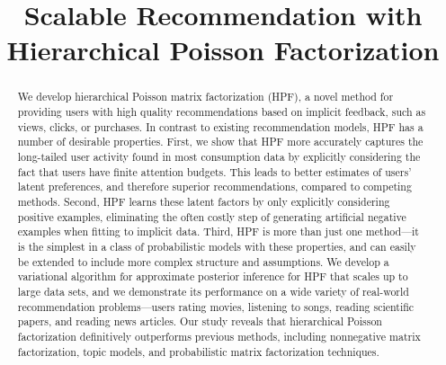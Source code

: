 \documentclass[]{article}
\title{Scalable Recommendation with Hierarchical Poisson Factorization}
\author{} %
\begin{document}
\maketitle

\begin{abstract}
We develop hierarchical Poisson matrix factorization (HPF), a novel
method for providing users with high quality recommendations based on
implicit feedback, such as views, clicks, or purchases.  In contrast
to existing recommendation models, HPF has a number of desirable
properties.  First, we show that HPF more accurately captures the
long-tailed user activity found in most consumption data by explicitly
considering the fact that users have finite attention budgets.  This
leads to better estimates of users' latent preferences, and therefore
superior recommendations, compared to competing methods.  Second, HPF
learns these latent factors by only explicitly considering positive
examples, eliminating the often costly step of generating artificial
negative examples when fitting to implicit data.  Third, HPF is more
than just one method---it is the simplest in a class of probabilistic
models with these properties, and can easily be extended to include
more complex structure and assumptions.  We develop a variational
algorithm for approximate posterior inference for HPF that scales up
to large data sets, and we demonstrate its performance on a wide
variety of real-world recommendation problems---users rating movies,
listening to songs, reading scientific papers, and reading news
articles.  Our study reveals that hierarchical Poisson factorization
definitively outperforms previous methods, including nonnegative
matrix factorization, topic models, and probabilistic matrix
factorization techniques.
\end{abstract}








\small{
  
  
}

\end{document}
